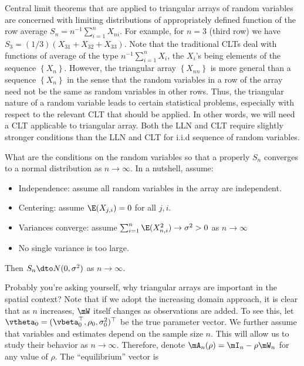 Central limit theorems that are applied to triangular arrays of random variables are concerned with limiting distributions of appropriately defined function of the row average $S_n = n^{-1}\sum_{i = 1}^nX_{ni}$. For example, for $n = 3$ (third row) we have $S_3 = (1/3)(X_{31} + X_{32} + X_{33})$.  Note that the traditional CLTs deal with functions of average of the type $n^{-1}\sum_{i = 1}^n X_i$, the $X_i$'s being elements of the sequence $\left\lbrace X_n\right\rbrace$. However, the triangular array $\left\lbrace X_{nn}\right\rbrace$ is more general than a sequence $\left\lbrace X_n\right\rbrace$ in the sense that the random variables in a row of the array need not be the same as random variables in other rows. Thus, the triangular nature of a random variable leads to certain statistical problems, especially with respect to the relevant CLT that should be applied. In other words, we will need a CLT applicable to triangular array. Both the LLN and CLT require slightly stronger conditions than the LLN and CLT for i.i.d sequence of random variables. 

What are the conditions on the random variables so that a properly $S_n$ converges to a normal distribution as $n\to \infty$. In a nutshell, assume: 

\begin{itemize}
  \item Independence: assume all random variables in the array are independent.
  \item Centering: assume $\E(X_{j,i}) = 0$ for all $j, i$.
  \item Variances converge: assume $\sum_{i = 1}^n\E(X_{n, i}^2)\to \sigma^2> 0$ as $n\to\infty$
  \item No single variance is too large.
\end{itemize}

Then $S_n \dto N(0, \sigma^2)$ as $n\to\infty$.

Probably you're asking yourself, why triangular arrays are important in the spatial context? Note that if we adopt the increasing domain approach, it is clear that as $n$ increases,  $\mW$ itself changes as observations are added. To see this,  let $\vtheta_0 = (\vbeta_0^\top, \rho_0, \sigma_0^2)^\top$ be the true parameter vector. We further assume that variables and estimates depend on the sample size $n$. This will allow us to study their behavior as $n\to \infty$.  Therefore, denote $\mA_n(\rho) = \mI_n - \rho \mW_n$ for any value of $\rho$. The ``equilibrium'' vector is

